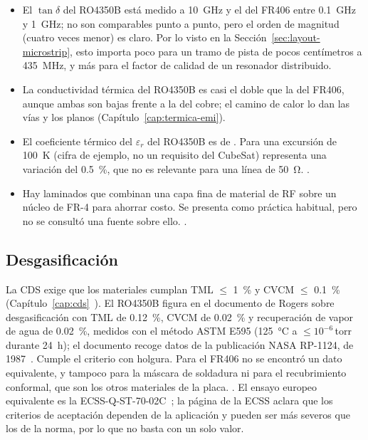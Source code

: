 \begin{itemize}
  \item El $\tan\delta$ del RO4350B está medido a \SI{10}{\giga\hertz} y el del FR406 entre \SI{0,1}{\giga\hertz} y \SI{1}{\giga\hertz}; no son comparables punto a punto, pero el orden de magnitud (cuatro veces menor) es claro. Por lo visto en la Sección~\ref{sec:layout-microstrip}, esto importa poco para un tramo de pista de pocos centímetros a \SI{435}{\mega\hertz}, y más para el factor de calidad de un resonador distribuido.
  \item La conductividad térmica del RO4350B es casi el doble que la del FR406, aunque ambas son bajas frente a la del cobre; el camino de calor lo dan las vías y los planos (Capítulo~\ref{cap:termica-emi}).
  \item El coeficiente térmico del $\varepsilon_r$ del RO4350B es de . Para una excursión de \SI{100}{\kelvin} (cifra de ejemplo, no un requisito del CubeSat) representa una variación del \SI{0,5}{\percent}, que no es relevante para una línea de \SI{50}{\ohm}. .
  \item Hay laminados que combinan una capa fina de material de RF sobre un núcleo de FR-4 para ahorrar costo. Se presenta como práctica habitual, pero no se consultó una fuente sobre ello. .
\end{itemize}

\subsection{Desgasificación}\label{sec:layout-outgassing}

La CDS exige que los materiales cumplan TML $\le$ \SI{1}{\percent} y CVCM $\le$ \SI{0,1}{\percent} (Capítulo~\ref{cap:cds}~\cite{cds14}). El RO4350B figura en el documento de Rogers sobre desgasificación con TML de \SI{0,12}{\percent}, CVCM de \SI{0,02}{\percent} y recuperación de vapor de agua de \SI{0,02}{\percent}, medidos con el método ASTM E595 (\SI{125}{\celsius} a $\le 10^{-6}$\,torr durante \SI{24}{\hour}); el documento recoge datos de la publicación NASA RP-1124, de 1987~\cite{rogersoutgas}. Cumple el criterio con holgura. Para el FR406 no se encontró un dato equivalente, y tampoco para la máscara de soldadura ni para el recubrimiento conformal, que son los otros materiales de la placa. . El ensayo europeo equivalente es la ECSS-Q-ST-70\nobreakdash-02C~\cite{ecss7002}; la página de la ECSS aclara que los criterios de aceptación dependen de la aplicación y pueden ser más severos que los de la norma, por lo que no basta con un solo valor.

